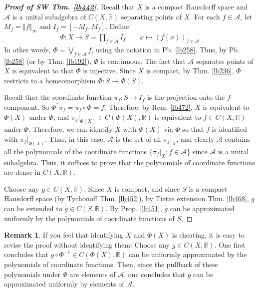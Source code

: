 \documentclass[12pt,b5paper,notitlepage]{article}
\theoremstyle{definition}
\newtheorem{rem}[df]{Remark}
\theoremstyle{plain}
\newcommand{\wtd}{\widetilde}
\newcommand{\scr}{\mathscr}
\newcommand{\Rbb}{\mathbb R}
\numberwithin{equation}{section}
\begin{document}
\begin{proof}[\textbf{Proof of SW Thm. \ref{lb442}}]
Recall that $X$ is a compact Hausdorff space and $\scr A$ is a unital subalgebra of $C(X,\Rbb)$ separating points of $X$. For each $f\in\scr A$, let $M_f=\Vert f\Vert_\infty$ and $I_f=[-M_f,M_f]$. Define
\begin{gather*}
\Phi:X\rightarrow S=\prod_{f\in\scr A}I_f\qquad x\mapsto (f(x))_{f\in\scr A}
\end{gather*}
In other words, $\Phi=\bigvee_{f\in\scr A}f$, using the notation in Pb. \ref{lb258}. Thus, by Pb. \ref{lb258} (or by Thm. \ref{lb192}), $\Phi$ is continuous. The fact that $\scr A$ separates points of $X$ is equivalent to that $\Phi$ is injective. Since $X$ is compact, by Thm. \ref{lb236}, $\Phi$ restricts to a homeomorphism $\Phi:S\rightarrow\Phi(S)$. 

Recall that the coordinate function $\pi_f:S\rightarrow I_f$ is the projection onto the $f$-component. So $\Phi^*\pi_f=\pi_f\circ\Phi=f$. Therefore, by Rem. \ref{lb472}, $X$ is equivalent to $\Phi(X)$ under $\Phi$, and $\pi_f|_{\Phi(X)}\in C(\Phi(X),\Rbb)$ is equivalent to $f\in C(X,\Rbb)$ under $\Phi$. Therefore, we can identify $X$ with $\Phi(X)$ via $\Phi$ so that $f$ is identified with $\pi_f|_{\Phi(X)}$. Thus, in this case, $\scr A$ is the set of all $\pi_f|_X$, and clearly $\scr A$ contains all the polynomials of the coordinate functions $\{\pi_f|_X:f\in\scr A\}$ since $\scr A$ is a unital subalgebra. Thus, it suffices to prove that the polynomials of coordinate functions are dense in $C(X,\Rbb)$. 

Choose any $g\in C(X,\Rbb)$. Since $X$ is compact, and since $S$ is a compact Hausdorff space (by Tychonoff Thm. \ref{lb452}), by Tietze extension Thm. \ref{lb468}, $g$ can be extended to $\wtd g\in C(S,\Rbb)$. By Prop. \ref{lb451}, $\wtd g$ can be approximated uniformly by the polynomials of coordinate functions of $S$.
\end{proof}



\begin{rem}
If you feel that identifying $X$ and $\Phi(X)$ is cheating, it is easy to revise the proof without identifying them: Choose any $g\in C(X,\Rbb)$. One first concludes that $g\circ\Phi^{-1}\in C(\Phi(X),\Rbb)$ can be uniformly approximated by the polynomials of coordinate functions. Then, since the pullback of these polynomials under $\Phi$ are elements of $\scr A$, one concludes that $g$ can be approximated uniformly by elements of $\scr A$.
\end{rem}
\end{document}
